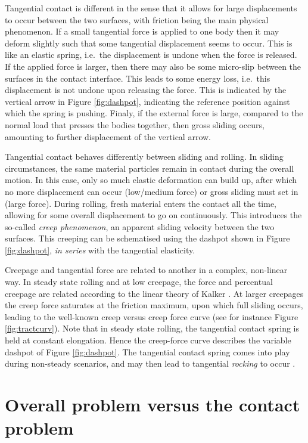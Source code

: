 \documentclass[12pt]{report}
\begin{document}
Tangential contact is different in the sense that it allows for large
displacements to occur between the two surfaces, with friction being the
main physical phenomenon. If a small tangential force is applied to one
body then it may deform slightly such that some tangential displacement seems
to occur. This is like an elastic spring, i.e.\ the displacement is undone
when the force is released. If the applied force is larger, then there may
also be some micro-slip between the surfaces in the contact interface. This
leads to some energy loss, i.e.\ this displacement is not undone upon
releasing the force. This is indicated by the vertical arrow in Figure
\ref{fig:dashpot}, indicating the reference position against which the
spring is pushing. Finaly, if the external force is large, compared to
the normal load that presses the bodies together, then gross sliding
occurs, amounting to further displacement of the vertical arrow.

Tangential contact behaves differently between sliding and rolling. In
sliding circumstances, the same material particles remain in contact during
the overall motion. In this case, only so much elastic deformation can
build up, after which no more displacement can occur (low/medium force) or
gross sliding must set in (large force). During rolling, fresh material
enters the contact all the time, allowing for some overall displacement to
go on continuously. This introduces the so-called {\em creep phenomenon\/},
an apparent sliding velocity between the two surfaces. This creeping can be
schematised using the dashpot shown in Figure \ref{fig:dashpot}, {\em in
series\/} with the tangential elasticity.

Creepage and tangential force are related to another in a complex,
non-linear way.
In steady state rolling and at low creepage, the force and percentual
creepage are related according to the linear theory of Kalker
\cite{Kalker1967,Kalker1990}. At larger creepages the creep
force saturates at the friction maximum, upon which full sliding occurs,
leading to the well-known creep versus creep force curve (see for instance
Figure \ref{fig:tractcurv}). Note that in steady state rolling, the
tangential contact spring is held at constant elongation.  Hence the
creep-force curve describes the variable dashpot of Figure
\ref{fig:dashpot}. The tangential contact spring comes into play during
non-steady scenarios, and may then lead to tangential {\em rocking\/} to
occur \cite{Vollebregt2015b-iavsd2015,Vollebregt2017a-iavsd2017}.

\section{Overall problem versus the contact problem}
\end{document}
